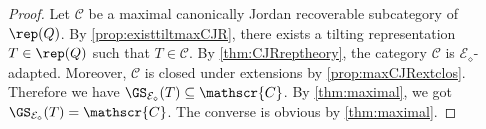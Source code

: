 \begin{proof}
Let $\mathscr{C}$ be a maximal canonically Jordan recoverable subcategory of $\rep(Q)$. By \cref{prop:existtiltmaxCJR}, there exists a tilting representation $T \in \rep(Q)$ such that $T \in \mathscr{C}$. By \cref{thm:CJRreptheory}, the category $\mathscr{C}$ is $\mathcal{E}_\diamond$-adapted. Moreover, $\mathscr{C}$ is closed under extensions by \cref{prop:maxCJRextclos}. Therefore we have $\GS_{\mathcal{E}_{\diamond}}(T) \subseteq \mathscr{C}$. By \cref{thm:maximal}, we got $\GS_{\mathcal{E}_\diamond}(T) = \mathscr{C}$. The converse is obvious by \cref{thm:maximal}.
\end{proof}